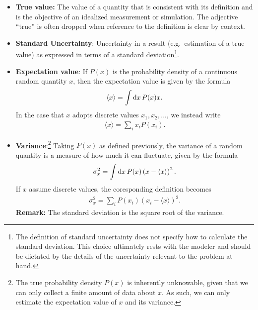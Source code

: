 \begin{itemize}
\item {\bf True value:}  The value of a quantity that is consistent with its definition and is the objective of an idealized measurement or simulation. The adjective ``true'' is often dropped when reference to the definition is clear by context\citep{JCGM:GUM2008,JCGM:VIM2012}.
  \label{def:true_value}




\item {\bf Standard Uncertainty}: Uncertainty in a result (e.g.\ estimation of a true value) as expressed in terms of a standard deviation\footnote{The definition of standard uncertainty does not specify how to calculate the standard deviation.
    This choice ultimately rests with the modeler and should be dictated by the details of the uncertainty relevant to the problem at hand.}.
  \label{def:std_unc}


\item {\bf Expectation value}:  If $P(x)$ is the probability density of a continuous random quantity $x$, then the expectation value is given by the formula
\begin{align}
  \langle x \rangle = \int {\rm d}x\, P(x) x.
\end{align}
In the case that $x$ adopts discrete values $x_1,x_2,...$, we instead write
\begin{align}
\langle x \rangle = \sum_i x_i P(x_i).
\end{align}

\item {\bf Variance}:\footnote{The true probability density $P(x)$ is inherently unknowable, given that we can only collect a finite amount of data about $x$.  As such, we can only estimate the expectation value of $x$ and its variance.} Taking $P(x)$ as defined previously, the variance of a random quantity is a measure of how much it can fluctuate, given by the formula
\begin{align}
\sigma_x^2 = \int {\rm d}x\, P(x) \left( x  - \langle x \rangle \right)^2.
\end{align}
If $x$ assume discrete values, the coresponding definition becomes
\begin{align}
\sigma_x^2 = \sum_i P(x_i) \left( x_i  - \langle x \rangle \right)^2.
\end{align}
{\bf Remark:} The standard deviation is the square root of the variance.


\end{itemize}
